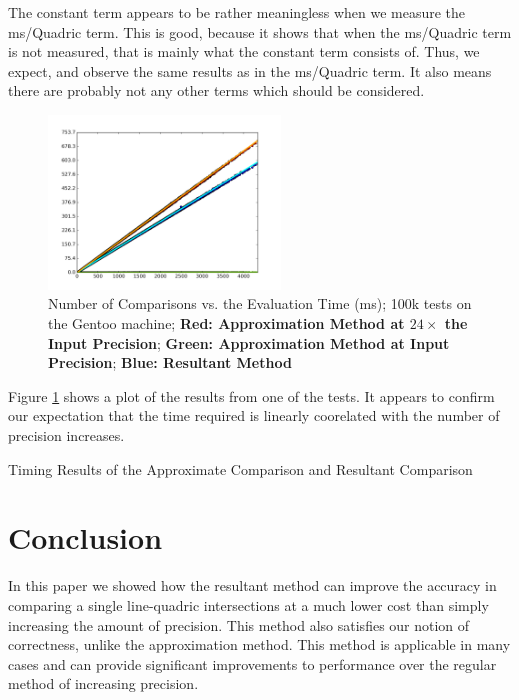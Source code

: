 \documentclass{cccg16}
\begin{document}
The constant term appears to be rather meaningless when we measure the
ms/Quadric term.  This is good, because it shows that when the
ms/Quadric term is not measured, that is mainly what the constant term
consists of.  Thus, we expect, and observe the same results as in the
ms/Quadric term.  It also means there are probably not any other terms
which should be considered.

\begin{figure}
  \includegraphics[width=0.55\textwidth]{imgs/hardEllipsoidsSingle_gentoo_adjusted.png}
  \caption{Number of Comparisons vs. the Evaluation Time (ms); 100k
    tests on the Gentoo machine; {\bf Red: Approximation Method at
      $24\times$ the Input Precision}; {\bf Green: Approximation
      Method at Input Precision}; {\bf Blue: Resultant Method}}
  \label{fig:linefit}
\end{figure}

Figure \ref{fig:linefit} shows a plot of the results from one of the
tests.  It appears to confirm our expectation that the time required
is linearly coorelated with the number of precision increases.

\begin{table}
  \caption{Timing Results of the Approximate Comparison and Resultant Comparison}
  \label{tab:times}
  
\end{table}

\section{Conclusion}
In this paper we showed how the resultant method can improve the
accuracy in comparing a single line-quadric intersections at a much
lower cost than simply increasing the amount of precision.  This
method also satisfies our notion of correctness, unlike the
approximation method.  This method is applicable in many cases and can
provide significant improvements to performance over the regular
method of increasing precision.
\end{document}
